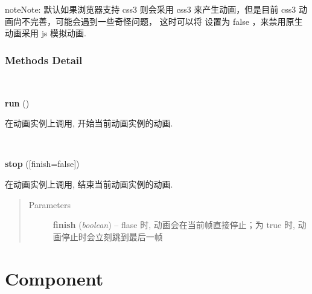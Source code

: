 \documentclass[letterpaper,10pt,english]{sphinxmanual}
\begin{document}
\begin{notice}{note}{Note:}
默认如果浏览器支持 css3 则会采用 css3 来产生动画，但是目前 css3 动画尙不完善，可能会遇到一些奇怪问题，
这时可以将  设置为 false ，来禁用原生动画采用 js 模拟动画.
\end{notice}


\subsubsection{Methods Detail}
\label{api/core/anim/index:methods-detail}

\begin{fulllineitems}
\label{api/core/anim/index:Anim.run}~
\begin{DUlineblock}{0em}
\item[] \textbf{run} ()
\item[] 在动画实例上调用, 开始当前动画实例的动画.
\end{DUlineblock}

\end{fulllineitems}



\begin{fulllineitems}
\label{api/core/anim/index:Anim.stop}~
\begin{DUlineblock}{0em}
\item[] \textbf{stop} ({[}finish=false{]})
\item[] 在动画实例上调用, 结束当前动画实例的动画.
\end{DUlineblock}
\begin{quote}\begin{description}
\item[{Parameters}] \leavevmode
\textbf{finish} (\emph{boolean}) -- flase 时, 动画会在当前帧直接停止；为 true 时, 动画停止时会立刻跳到最后一帧

\end{description}\end{quote}

\end{fulllineitems}



\section{Component}
\label{api/component/index:component}\label{api/component/index::doc}\label{api/component/index:id1}\label{api/component/template/index:module-Template}
\end{document}
